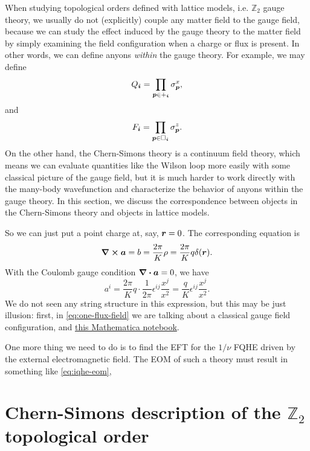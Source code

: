 \documentclass[hyperref, a4paper]{article}
\begin{document}
When studying topological orders defined with lattice models, i.e. $\mathbb{Z}_2$ gauge theory, we usually 
do not (explicitly) couple any matter field to the gauge field, because we can study the effect induced by 
the gauge theory to the matter field by simply examining the field configuration when a charge or flux is 
present. In other words, we can define anyons \emph{within} the gauge theory. For example, we may define 
\begin{equation}
    Q_{\vb*{i}} = \prod_{\vb*{p} \in +_{\vb*{i}}} \sigma^x_{\vb*{p}},
\end{equation}
and 
\begin{equation}
    F_{\vb*{i}} = \prod_{\vb*{p} \in \Box_{\vb*{i}}} \sigma^z_{\vb*{p}}.
\end{equation}
On the other hand, the Chern-Simons theory is a continuum field theory, which means we can evaluate quantities like the 
Wilson loop more easily with some classical picture of the gauge field, but it is much harder to 
work directly with the many-body wavefunction and characterize the behavior of anyons within the 
gauge theory. In this section, we discuss the correspondence between objects in the Chern-Simons theory 
and objects in lattice models.

So we can just put a point charge at, say, $\vb*{r} = 0$. The corresponding equation is 
\[
    \curl{\vb*{a}} = b = \frac{2\pi}{K} \rho = \frac{2\pi}{K} q \delta(\vb*{r}).
\]
With the Coulomb gauge condition $\div{\vb*{a}} = 0$, we have 
\begin{equation}
    a^i = \frac{2\pi}{K} q \cdot \frac{1}{2\pi} \epsilon^{ij} \frac{x^j}{x^2} = \frac{q}{K} \epsilon^{ij} \frac{x^j}{x^2}.
    \label{eq:one-flux-field}
\end{equation}
We do not seen any string structure in this expression, but this may be just illusion: first, 
in \eqref{eq:one-flux-field} we are talking about a classical gauge field configuration, and 
\href{chern-simons-single-flux.nb}{this Mathematica notebook}.

One more thing we need to do is to find the EFT for the $1 / \nu$ FQHE driven by the external electromagnetic field.
The EOM of such a theory must result in something like \eqref{eq:iqhe-eom}, 

\section{Chern-Simons description of the $\mathbb{Z}_2$ topological order}
\end{document}
